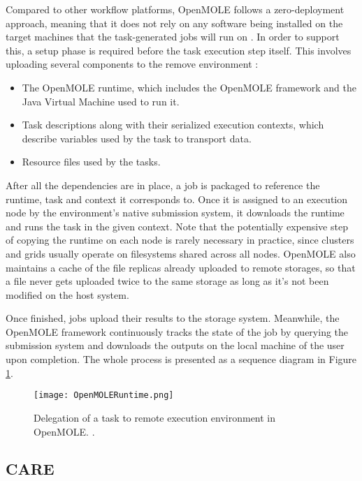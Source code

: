 Compared to other workflow platforms, OpenMOLE follows a zero-deployment approach, meaning that it does not rely on any software being installed on the target machines that the task-generated jobs will run on \cite{Reuillon2013}. In order to support this, a setup phase is required before the task execution step itself. This involves uploading several components to the remove environment \cite{Reuillon2010}:

\begin{itemize}
	\item The OpenMOLE runtime, which includes the OpenMOLE framework and the Java Virtual Machine used to run it.
	\item Task descriptions along with their serialized execution contexts, which describe variables used by the task to transport data.
	\item Resource files used by the tasks.
\end{itemize}

After all the dependencies are in place, a job is packaged to reference the runtime, task and context it corresponds to. Once it is assigned to an execution node by the environment's native submission system, it downloads the runtime and runs the task in the given context. Note that the potentially expensive step of copying the runtime on each node is rarely necessary in practice, since clusters and grids usually operate on filesystems shared across all nodes. OpenMOLE also maintains a cache of the file replicas already uploaded to remote storages, so that a file never gets uploaded twice to the same storage as long as it's not been modified on the host system.

Once finished, jobs upload their results to the storage system. Meanwhile, the OpenMOLE framework continuously tracks the state of the job by querying the submission system and downloads the outputs on the local machine of the user upon completion. The whole process is presented as a sequence diagram in Figure \ref{OpenMOLERuntime}.

\begin{figure}[H]
	\centering
		\texttt{[image: OpenMOLERuntime.png]}
	\caption{Delegation of a task to remote execution environment in OpenMOLE. \cite{Reuillon2010}.}
	\label{OpenMOLERuntime}
\end{figure}

\subsection{CARE} \label{CARESection}

